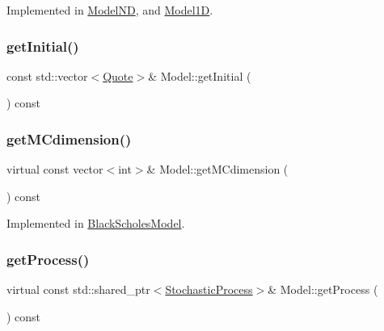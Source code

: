 Implemented in \hyperlink{class_model_n_d_ab2356536a38f4961257654de629d6093}{Model\+ND}, and \hyperlink{class_model1_d_ac81875523be6153cb58d0f37914eb9a1}{Model1D}.

\hypertarget{class_model_ade5d08aae4d32777bfa048f356bbcca9}{}\label{class_model_ade5d08aae4d32777bfa048f356bbcca9} 
\subsubsection{\texorpdfstring{get\+Initial()}{getInitial()}}
{\footnotesize\ttfamily const std\+::vector$<$\hyperlink{_name_def_8h_a642a6c5fd87319d922637de0e0bb0305}{Quote}$>$\& Model\+::get\+Initial (\begin{DoxyParamCaption}{ }\end{DoxyParamCaption}) const\hspace{0.3cm}{\ttfamily [inline]}}

\hypertarget{class_model_ac8a8c7e69b0be1df63ad141e0e14bf1e}{}\label{class_model_ac8a8c7e69b0be1df63ad141e0e14bf1e} 
\subsubsection{\texorpdfstring{get\+M\+Cdimension()}{getMCdimension()}}
{\footnotesize\ttfamily virtual const vector$<$int$>$\& Model\+::get\+M\+Cdimension (\begin{DoxyParamCaption}{ }\end{DoxyParamCaption}) const\hspace{0.3cm}{\ttfamily [pure virtual]}}



Implemented in \hyperlink{class_black_scholes_model_a5665e6ea247e4f243082f5c98bbdbad6}{Black\+Scholes\+Model}.

\hypertarget{class_model_adc6a695d3f6b2def79f2dde69b3ab547}{}\label{class_model_adc6a695d3f6b2def79f2dde69b3ab547} 
\subsubsection{\texorpdfstring{get\+Process()}{getProcess()}\hspace{0.1cm}{\footnotesize\ttfamily [1/2]}}
{\footnotesize\ttfamily virtual const std\+::shared\+\_\+ptr$<$\hyperlink{class_stochastic_process}{Stochastic\+Process}$>$\& Model\+::get\+Process (\begin{DoxyParamCaption}{ }\end{DoxyParamCaption}) const\hspace{0.3cm}{\ttfamily [pure virtual]}}



